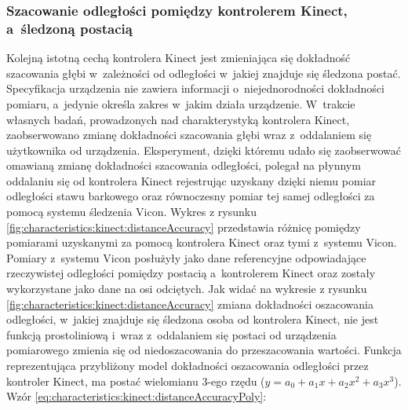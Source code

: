 																																					
\subsubsection*{Szacowanie odległości pomiędzy kontrolerem Kinect, a~śledzoną postacią}\label{sssection:distanceEstimation}
Kolejną istotną cechą kontrolera Kinect jest zmieniająca się dokładność szacowania głębi w~zależności od odległości w~jakiej znajduje się śledzona postać. Specyfikacja urządzenia nie zawiera informacji o~niejednorodności dokładności pomiaru, a~jedynie określa zakres w~jakim działa urządzenie. W~trakcie własnych badań, prowadzonych nad charakterystyką kontrolera Kinect, zaobserwowano zmianę dokładności szacowania głębi wraz z~oddalaniem się użytkownika od urządzenia. Eksperyment, dzięki któremu udało się zaobserwować omawianą zmianę dokładności szacowania odległości, polegał na płynnym oddalaniu się od kontrolera Kinect rejestrując uzyskany dzięki niemu pomiar odległości stawu barkowego oraz równoczesny pomiar tej samej odległości za pomocą systemu śledzenia Vicon. Wykres z rysunku \ref{fig:characteristics:kinect:distanceAccuracy} przedstawia różnicę pomiędzy pomiarami uzyskanymi za pomocą kontrolera Kinect oraz tymi z~systemu Vicon. Pomiary z~systemu Vicon posłużyły jako dane referencyjne odpowiadające rzeczywistej odległości pomiędzy postacią a~kontrolerem Kinect oraz zostały wykorzystane jako dane na osi odciętych. Jak widać na wykresie z rysunku \ref{fig:characteristics:kinect:distanceAccuracy} zmiana dokładności oszacowania odległości, w~jakiej znajduje się śledzona osoba od kontrolera Kinect, nie jest funkcją prostoliniową i~wraz z~oddalaniem się postaci od urządzenia pomiarowego zmienia się od niedoszacowania do przeszacowania wartości. Funkcja reprezentująca przybliżony model dokładności oszacowania odległości przez kontroler Kinect, ma postać wielomianu 3-ego rzędu ($y = a_0 + a_1x + a_2x^2 + a_3x^3$). Wzór \ref{eq:characteristics:kinect:distanceAccuracyPoly}: 
																																							
